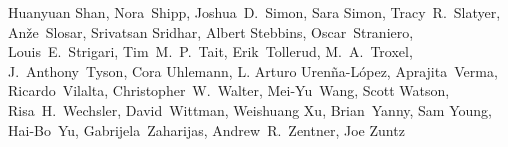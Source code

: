 \begin{raggedright}
Huanyuan Shan,
Nora~Shipp,
Joshua~D.~Simon,
Sara Simon,
Tracy~R.~Slatyer,
An\v{z}e~Slosar,
Srivatsan Sridhar,
Albert Stebbins,
Oscar~Straniero,
Louis~E.~Strigari,
Tim~M.~P.~Tait,
Erik~Tollerud,
M.~A.~Troxel,
J.~Anthony~Tyson,
Cora Uhlemann,
L. Arturo Uren\~na-L\'opez,
Aprajita~Verma,
Ricardo~Vilalta,
Christopher~W.~Walter,
Mei-Yu~Wang,
Scott Watson,
Risa~H.~Wechsler,
David~Wittman,
Weishuang Xu,
Brian~Yanny,
Sam Young,
Hai-Bo~Yu,
Gabrijela~Zaharijas,
Andrew~R.~Zentner,
Joe Zuntz

\end{raggedright}
